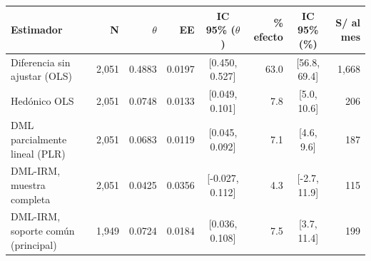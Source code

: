 \begin{tabular}{lrrrcrcr}
\toprule
Estimador & N & $\theta$ & EE & IC 95\% ($\theta$) & \% efecto & IC 95\% (\%) & S/ al mes \\
\midrule
Diferencia sin ajustar (OLS) & 2,051 & 0.4883 & 0.0197 & [0.450, 0.527] & 63.0 & [56.8, 69.4] & 1,668 \\
Hedónico OLS & 2,051 & 0.0748 & 0.0133 & [0.049, 0.101] & 7.8 & [5.0, 10.6] & 206 \\
DML parcialmente lineal (PLR) & 2,051 & 0.0683 & 0.0119 & [0.045, 0.092] & 7.1 & [4.6, 9.6] & 187 \\
DML-IRM, muestra completa & 2,051 & 0.0425 & 0.0356 & [-0.027, 0.112] & 4.3 & [-2.7, 11.9] & 115 \\
DML-IRM, soporte común (principal) & 1,949 & 0.0724 & 0.0184 & [0.036, 0.108] & 7.5 & [3.7, 11.4] & 199 \\
\bottomrule
\end{tabular}